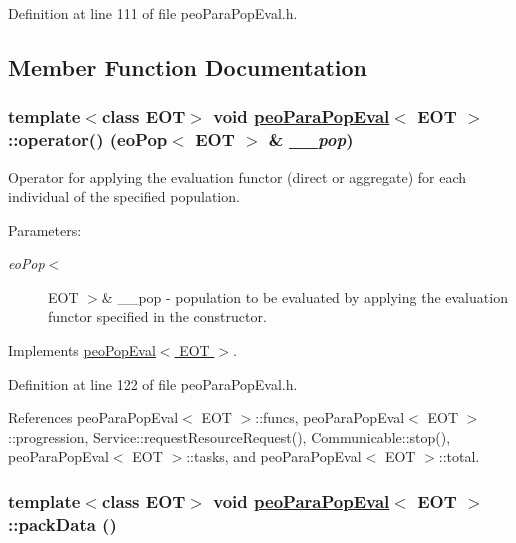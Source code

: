 Definition at line 111 of file peo\-Para\-Pop\-Eval.h.

\subsection{Member Function Documentation}
\hypertarget{classpeoParaPopEval_aeaa4fca4f8650e453e308838b4a2cb5}{
\subsubsection[operator()]{\setlength{\rightskip}{0pt plus 5cm}template$<$class EOT$>$ void \hyperlink{classpeoParaPopEval}{peo\-Para\-Pop\-Eval}$<$ EOT $>$::operator() (eo\-Pop$<$ EOT $>$ \& {\em \_\-\_\-pop})}}
\label{classpeoParaPopEval_aeaa4fca4f8650e453e308838b4a2cb5}


Operator for applying the evaluation functor (direct or aggregate) for each individual of the specified population. 

\begin{Desc}
\item[Parameters:]
\begin{description}
\item[{\em eo\-Pop$<$}]EOT $>$\& \_\-\_\-pop - population to be evaluated by applying the evaluation functor specified in the constructor. \end{description}
\end{Desc}


Implements \hyperlink{classpeoPopEval_2f208067a5e39c3b26c1234050a41e8f}{peo\-Pop\-Eval$<$ EOT $>$}.

Definition at line 122 of file peo\-Para\-Pop\-Eval.h.

References peo\-Para\-Pop\-Eval$<$ EOT $>$::funcs, peo\-Para\-Pop\-Eval$<$ EOT $>$::progression, Service::request\-Resource\-Request(), Communicable::stop(), peo\-Para\-Pop\-Eval$<$ EOT $>$::tasks, and peo\-Para\-Pop\-Eval$<$ EOT $>$::total.\hypertarget{classpeoParaPopEval_fea632bd645ab11182782fd3c038d6d8}{
\subsubsection[packData]{\setlength{\rightskip}{0pt plus 5cm}template$<$class EOT$>$ void \hyperlink{classpeoParaPopEval}{peo\-Para\-Pop\-Eval}$<$ EOT $>$::pack\-Data ()}}
\label{classpeoParaPopEval_fea632bd645ab11182782fd3c038d6d8}


